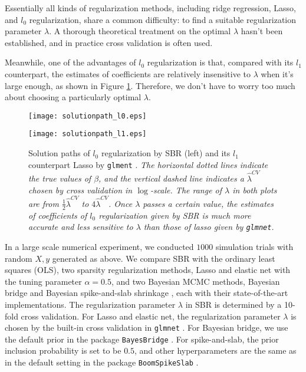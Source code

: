 \documentclass[11pt]{article}%
\numberwithin{equation}{section}
\theoremstyle{plain}
\begin{document}
Essentially all kinds of regularization methods, including ridge regression, Lasso, and $l_0$ regularization, share a common difficulty: to find a suitable regularization parameter $\lambda$.  A thorough theoretical treatment on the optimal $\lambda$ hasn't been established, and in practice cross validation is often used.

Meanwhile, one of the advantages of $l_0$ regularization is that, compared with its $l_1$ counterpart, the estimates of coefficients are relatively insensitive to $\lambda$ when it's large enough, as shown in Figure \ref{fig:solutionpath}.  Therefore, we don't have to worry too much about choosing a particularly optimal $\lambda$.

\begin{figure}[!htb]
\centering
   \begin{minipage}{0.49\textwidth}
     \texttt{[image: solutionpath\_l0.eps]}
   \end{minipage}
   \begin {minipage}{0.49\textwidth}
     \texttt{[image: solutionpath\_l1.eps]}
   \end{minipage}
  \caption{Solution paths of $l_0$ regularization by SBR (left) and its $l_1$ counterpart Lasso by \texttt{glment} \citep{glmnet}.  \textit{The horizontal dotted lines indicate the true values of $\beta$, and the vertical dashed line indicates a $\hat\lambda^{CV}$ chosen by cross validation in $\log$-scale.  The range of $\lambda$ in both plots are from $\frac12\hat\lambda^{CV}$ to $4\hat\lambda^{CV}$.  Once $\lambda$ passes a certain value, the estimates of coefficients of $l_0$ regularization given by SBR is much more accurate and less sensitive to $\lambda$ than those of lasso given by \texttt{glmnet}.}}
\label{fig:solutionpath}
\end{figure}

In a large scale numerical experiment, we conducted $1000$ simulation trials with random $X, y$ generated as above.  We compare SBR with the ordinary least squares (OLS), two sparsity regularization methods, Lasso and elastic net with the tuning parameter $\alpha = 0.5$, and two Bayesian MCMC methods, Bayesian bridge \citep{polson2014} and Bayesian spike-and-slab shrinkage \citep{scott2014}, each with their state-of-the-art implementations.  The regularization parameter $\lambda$ in SBR is determined by a 10-fold cross validation.  For Lasso and elastic net, the regularization parameter $\lambda$ is chosen by the built-in cross validation in \texttt{glmnet} \citep{glmnet}.  For Bayesian bridge, we use the default prior in the package \texttt{BayesBridge} \citep{polson2012bridge}.  For spike-and-slab, the prior inclusion probability is set to be $0.5$, and other hyperparameters are the same as in the default setting in the package \texttt{BoomSpikeSlab} \citep{scott2016}.
\end{document}
